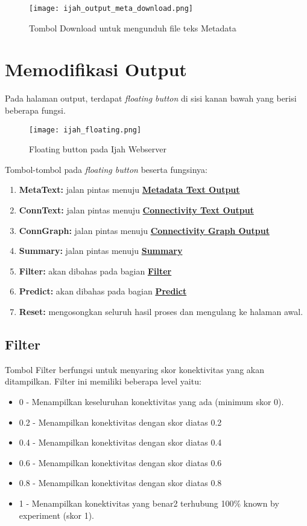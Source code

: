 	\begin{figure}[H]
	\centering
	\texttt{[image: ijah\_output\_meta\_download.png]}
	\caption{Tombol Download untuk mengunduh file teks Metadata}
	\label{fig:ijah_output_meta_download}
	\end{figure}


\section{Memodifikasi Output}
Pada halaman output, terdapat \emph{floating button} di sisi kanan bawah yang berisi beberapa fungsi.

	\begin{figure}[H]
	\centering
	\texttt{[image: ijah\_floating.png]}
	\caption{Floating button pada Ijah Webserver}
	\label{fig:ijah_floating}
	\end{figure}

Tombol-tombol pada \emph{floating button} beserta fungsinya:
\begin{enumerate}
\item \textbf{MetaText:} jalan pintas menuju \hyperref[meta]{\textbf{Metadata Text Output}}
\item \textbf{ConnText:} jalan pintas menuju \hyperref[text]{\textbf{Connectivity Text Output}}
\item \textbf{ConnGraph:} jalan pintas menuju \hyperref[graph]{\textbf{Connectivity Graph Output}}
\item \textbf{Summary:} jalan pintas menuju \hyperref[summary]{\textbf{Summary}}
\item \textbf{Filter:} akan dibahas pada bagian \hyperref[filter]{\textbf{Filter}}
\item \textbf{Predict:} akan dibahas pada bagian \hyperref[predictmore]{\textbf{Predict}}
\item \textbf{Reset:} mengosongkan seluruh hasil proses dan mengulang ke halaman awal.
\end{enumerate}

	\subsection{Filter} \label{filter}
	Tombol Filter berfungsi untuk menyaring skor konektivitas yang akan ditampilkan. Filter ini memiliki beberapa level yaitu:
	\begin{itemize}
	\item 0 - Menampilkan keseluruhan konektivitas yang ada (minimum skor 0).
	\item 0.2 - Menampilkan konektivitas dengan skor diatas 0.2
	\item 0.4 - Menampilkan konektivitas dengan skor diatas 0.4
	\item 0.6 - Menampilkan konektivitas dengan skor diatas 0.6
	\item 0.8 - Menampilkan konektivitas dengan skor diatas 0.8
	\item 1 - Menampilkan konektivitas yang benar2 terhubung 100\% known by experiment (skor 1).
	\end{itemize}


